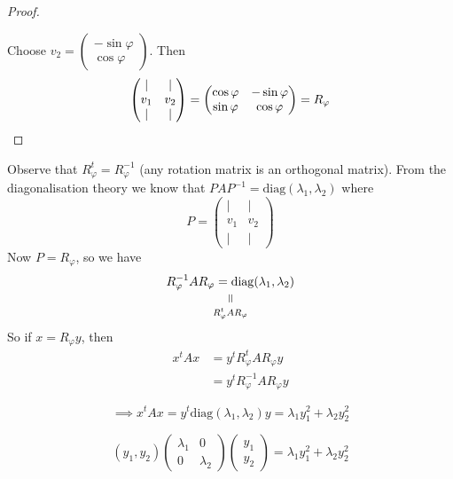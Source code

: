 \documentclass[10pt]{scrartcl}
\begin{document}
\begin{proof}
\begin{center}
\end{center}


Choose $v_2 = \begin{pmatrix}
  - \sin\varphi \\ \cos\varphi	
 \end{pmatrix}$. Then 
 \[
  \begin{pmatrix}
  | & | \\ v_1 & v_2 \\ | & | 	
  \end{pmatrix} = \begin{pmatrix}
  \cos\varphi & -\sin\varphi \\ \sin\varphi & \cos\varphi 	
 \end{pmatrix} = R_\varphi \qedhere
\]
\end{proof}


Observe that $R_\varphi^t = R_\varphi^{-1}$ (any rotation matrix is an orthogonal matrix). From the diagonalisation theory we know that $PAP^{-1} = \mathrm{diag}(\lambda_1,\lambda_2)$ where 
\[
P = \begin{pmatrix}
  | & | \\ v_1 & v_2 \\ | & | 	
  \end{pmatrix}
\]
Now $P = R_\varphi$, so we have 
\[
  \equalto{R_\varphi^{-1}AR_\varphi = \mathrm{diag}(\lambda_1,\lambda_2)}{\large R_\varphi^tAR_\varphi}
\]
So if $x = R_\varphi y$, then 
\begin{align*}
  x^tAx &= y^tR_\varphi^tAR_\varphi y\\
  &= y^tR_\varphi^{-1}AR_\varphi y
 \end{align*}
 
\[\implies x^tAx = y^t\mathrm{diag}(\lambda_1,\lambda_2)y = \lambda_1y_1^2 + \lambda_2y_2^2\]

\[(y_1,y_2)\begin{pmatrix}
 \lambda_1 & 0 \\ 0 & \lambda_2	
\end{pmatrix}\begin{pmatrix}
y_1 \\ y_2	
\end{pmatrix} = \lambda_1y_1^2 + \lambda_2y_2^2
\]
\end{document}
